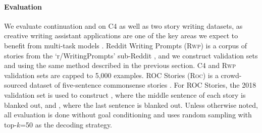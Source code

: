 \paragraph{Evaluation}
We evaluate continuation and \FitB{} on C4 as well as two story writing datasets, as creative writing assistant applications are one of the key areas we expect to benefit from multi-task models \citep{wordcraft}.
Reddit Writing Prompts (\textsc{Rwp}) is a corpus of stories from the `r/WritingPrompts' sub-Reddit \citep{fan2018hierarchical}, and we construct validation sets \rwpFITB{} and \rwpFITE{} using the same method described in the previous section.
C4 and \textsc{Rwp} validation sets are capped to 5,000 examples.
ROC Stories (\textsc{Roc}) is a crowd-sourced dataset of five-sentence commonsense stories \citep{mostafazadeh2016corpus}.
For ROC Stories, the 2018 validation set is used to construct \rocFITB, where the middle sentence of each story is blanked out, and \rocFITE, where the last sentence is blanked out.
Unless otherwise noted, all evaluation is done without goal conditioning and uses random sampling with top-$k$=50 as the decoding strategy.


